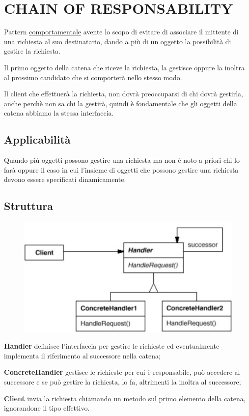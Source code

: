 \chapter{CHAIN OF RESPONSABILITY}

Pattern \underline{comportamentale} avente lo scopo di evitare di associare il mittente di una richiesta al suo destinatario, dando a più di un oggetto la 
possibilità di gestire la richiesta.

Il primo oggetto della catena che riceve la richiesta, la gestisce oppure la inoltra al prossimo candidato che si comporterà nello stesso modo. 

Il client che effettuerà la richiesta, non dovrà preoccuparsi di chi dovrà gestirla, anche perchè non sa chi la gestirà, quindi è fondamentale che gli oggetti 
della catena abbiamo la stessa interfaccia.

\section{Applicabilità}

Quando più oggetti possono gestire una richiesta ma non è noto a priori chi lo farà oppure il caso in cui l’insieme di oggetti che possono gestire una richiesta devono 
essere specificati dinamicamente.

\section{Struttura}

\begin{figure}[H]
    \centering
    \includegraphics[width=0.4\linewidth]{../../immagini/chain_of_responsability/struttura_handler}
\end{figure}

\textbf{Handler} definisce l'interfaccia per gestire le richieste ed eventualmente implementa il riferimento al successore nella catena;

\textbf{ConcreteHandler} gestisce le richieste per cui è responsabile, può accedere al successore e se può gestire la richiesta, lo fa, altrimenti la inoltra al 
successore;

\textbf{Client} invia la richiesta chiamando un metodo sul primo elemento della catena, ignorandone il tipo effettivo.


